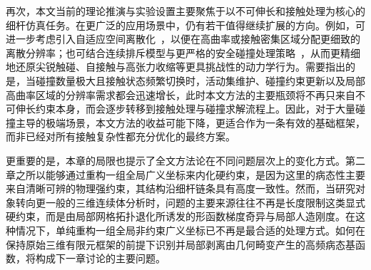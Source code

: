 再次，本文当前的理论推演与实验设置主要聚焦于以不可伸长和接触处理为核心的细杆仿真任务。在更广泛的应用场景中，仍有若干值得继续扩展的方向。例如，可进一步考虑引入自适应空间离散化~\cite{wen_cosserat_2020,sanchez-banderas_robust_2020}，以便在高曲率或接触密集区域分配更细致的离散分辨率；也可结合连续排斥模型与更严格的安全碰撞处理策略~\cite{otaduy2009implicit,Smith_2015_Bijective,Li_2020_incremental,wang2021large,Yu_2021_repulsive_curves}，从而更精细地还原尖锐触碰、自接触与高张力收缩等更具挑战性的动力学行为。需要指出的是，当碰撞数量极大且接触状态频繁切换时，活动集维护、碰撞约束更新以及局部高曲率区域的分辨率需求都会迅速增长，此时本文方法的主要瓶颈将不再只来自不可伸长约束本身，而会逐步转移到接触处理与碰撞求解流程上。因此，对于大量碰撞主导的极端场景，本文方法的收益可能下降，更适合作为一条有效的基础框架，而非已经对所有接触复杂性都充分优化的最终方案。

更重要的是，本章的局限也提示了全文方法论在不同问题层次上的变化方式。第二章之所以能够通过重构一组全局广义坐标来内化硬约束，是因为这里的病态性主要来自清晰可辨的物理强约束，其结构沿细杆链条具有高度一致性。然而，当研究对象转向更一般的三维连续体分析时，问题的主要来源往往不再是长度限制这类显式硬约束，而是由局部网格拓扑退化所诱发的形函数梯度奇异与局部人造刚度。在这种情况下，单纯重构一组全局非约束广义坐标已不再是最合适的处理方式。如何在保持原始三维有限元框架的前提下识别并局部剥离由几何畸变产生的高频病态基函数，将构成下一章讨论的主要问题。
